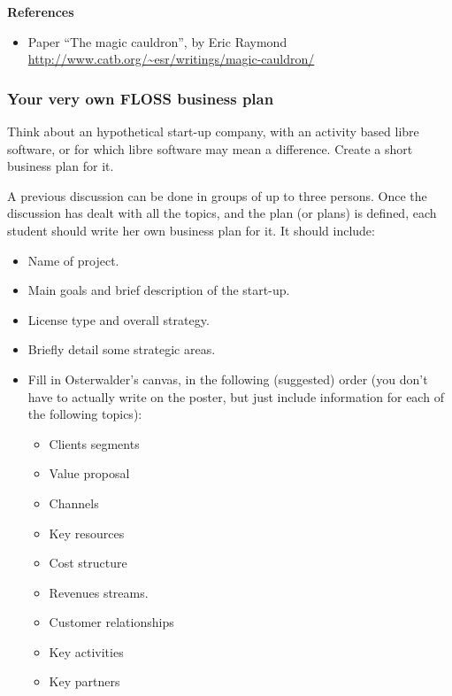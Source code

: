 \documentclass[a4paper]{article}
\begin{document}
\textbf{References}

\begin{itemize}
\item Paper ``The magic cauldron'', by Eric Raymond \\
  \url{http://www.catb.org/~esr/writings/magic-cauldron/}
\end{itemize}

\subsubsection{Your very own FLOSS business plan}
\label{sub:business-plan}

Think about an hypothetical start-up company, with an activity based libre software, or for which libre software may mean a difference. Create a short business plan for it.

A previous discussion can be done in groups of up to three persons. Once the discussion has dealt with all the topics, and the plan (or plans) is defined, each student should write her own business plan for it. It should include:

\begin{itemize}
\item Name of project.
\item Main goals and brief description of the start-up.
\item License type and overall strategy.
\item Briefly detail some strategic areas.
\item Fill in Osterwalder's canvas, in the following (suggested) order (you don't have to actually write on the poster, but just include information for each of the following topics):
  \begin{itemize}
  \item Clients segments
  \item Value proposal
  \item Channels
  \item Key resources
  \item Cost structure
  \item Revenues streams.
  \item Customer relationships
  \item Key activities
  \item Key partners
  \end{itemize}
\end{itemize}
\end{document}
